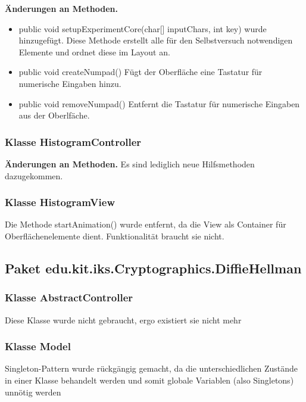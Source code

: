 \documentclass{article}
\begin{document}
	 \textbf{Änderungen an Methoden.}\newline
	   \begin{itemize}
	     \item public void setupExperimentCore(char[] inputChars, int key) wurde hinzugefügt.\newline
	           Diese Methode erstellt alle für den Selbstversuch notwendigen Elemente und ordnet diese im Layout an.
             \item public void createNumpad()\newline
               Fügt der Oberfläche eine Tastatur für numerische Eingaben hinzu.
             \item public void removeNumpad()\newline
               Entfernt die Tastatur für numerische Eingaben aus der Oberlfäche.
           \end{itemize}
               
	\subsubsection{Klasse HistogramController}
          \textbf{Änderungen an Methoden.}\newline
           Es sind lediglich neue Hilfsmethoden dazugekommen.
	\subsubsection{Klasse HistogramView}
	 Die Methode startAnimation() wurde entfernt, da die View als Container für Oberflächenelemente dient. 
	 Funktionalität braucht sie nicht.

  \subsection{Paket edu.kit.iks.Cryptographics.DiffieHellman}
  
    \subsubsection{Klasse AbstractController}
    Diese Klasse wurde nicht gebraucht, ergo existiert sie nicht mehr\newline

  	\subsubsection{Klasse Model}
    Singleton-Pattern wurde rückgängig gemacht, da die unterschiedlichen Zustände\newline
    in einer Klasse behandelt werden und somit globale Variablen (also Singletons)\newline
    unnötig werden\newline
\end{document}
